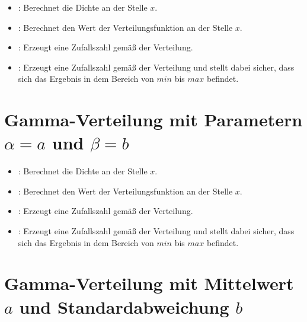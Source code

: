 \begin{itemize}

\item
{}:
Berechnet die Dichte an der Stelle $x$.

\item
{}:
Berechnet den Wert der Verteilungsfunktion an der Stelle $x$.

\item
{}:
Erzeugt eine Zufallszahl gemäß der Verteilung.

\item
{}:
Erzeugt eine Zufallszahl gemäß der Verteilung und stellt dabei sicher, dass sich das Ergebnis in dem Bereich von $min$ bis $max$ befindet.

\end{itemize}



\section{Gamma-Verteilung mit Parametern \texorpdfstring{$\alpha=a$}{a} und \texorpdfstring{$\beta=b$}{b}}

\begin{itemize}

\item
{}:
Berechnet die Dichte an der Stelle $x$.

\item
{}:
Berechnet den Wert der Verteilungsfunktion an der Stelle $x$.

\item
{}:
Erzeugt eine Zufallszahl gemäß der Verteilung.

\item
{}:
Erzeugt eine Zufallszahl gemäß der Verteilung und stellt dabei sicher, dass sich das Ergebnis in dem Bereich von $min$ bis $max$ befindet.

\end{itemize}



\section{Gamma-Verteilung mit Mittelwert \texorpdfstring{$a$}{a} und Standardabweichung \texorpdfstring{$b$}{b}}

